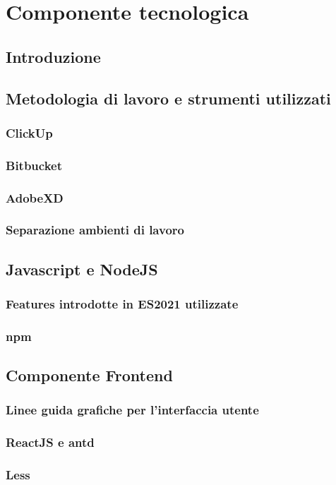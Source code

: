 \chapter{Componente tecnologica}
\section{Introduzione}
\section{Metodologia di lavoro e strumenti utilizzati}
\subsection{ClickUp}
\subsection{Bitbucket}
\subsection{AdobeXD}
\subsection{Separazione ambienti di lavoro}

\section{Javascript e NodeJS}
\subsection{Features introdotte in ES2021 utilizzate}
\subsection{npm}
\newpage
\section{Componente Frontend}
\subsection{Linee guida grafiche per l'interfaccia utente}
\subsection{ReactJS e antd}
\subsection{Less}
\newpage

